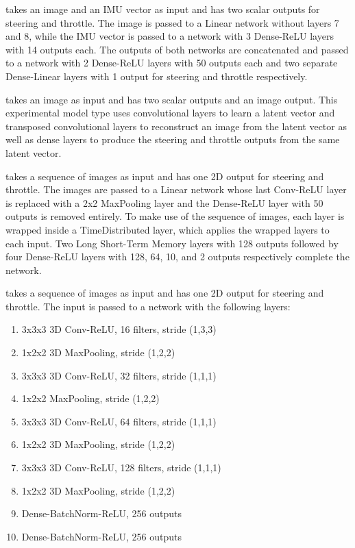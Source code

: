 \documentclass[conference]{IEEEtran}
\begin{document}
\begin{description}
\item[IMU] takes an image and an IMU vector as input and has two scalar outputs for steering and throttle. The image is passed to a Linear network without layers 7 and 8, while the IMU vector is passed to a network with 3 Dense-ReLU layers with 14 outputs each. The outputs of both networks are concatenated and passed to a network with 2 Dense-ReLU layers with 50 outputs each and two separate Dense-Linear layers with 1 output for steering and throttle respectively.
\item[Latent] takes an image as input and has two scalar outputs and an image output. This experimental model type uses convolutional layers to learn a latent vector and transposed convolutional layers to reconstruct an image from the latent vector as well as dense layers to produce the steering and throttle outputs from the same latent vector.
\item[RNN] takes a sequence of images as input and has one 2D output for steering and throttle. The images are passed to a Linear network whose last Conv-ReLU layer is replaced with a 2x2 MaxPooling layer and the Dense-ReLU layer with 50 outputs is removed entirely. To make use of the sequence of images, each layer is wrapped inside a TimeDistributed layer, which applies the wrapped layers to each input. Two Long Short-Term Memory layers with 128 outputs followed by four Dense-ReLU layers with 128, 64, 10, and 2 outputs respectively complete the network.
\item[3D] takes a sequence of images as input and has one 2D output for steering and throttle. The input is passed to a network with the following layers:
\begin{enumerate}
\item
3x3x3 3D Conv-ReLU, 16 filters, stride (1,3,3)
\item
1x2x2 3D MaxPooling, stride (1,2,2)
\item
3x3x3 3D Conv-ReLU, 32 filters, stride (1,1,1)
\item
1x2x2 MaxPooling, stride (1,2,2)
\item
3x3x3 3D Conv-ReLU, 64 filters, stride (1,1,1)
\item
1x2x2 3D MaxPooling, stride (1,2,2)
\item
3x3x3 3D Conv-ReLU, 128 filters, stride (1,1,1)
\item
1x2x2 3D MaxPooling, stride (1,2,2)
\item
Dense-BatchNorm-ReLU, 256 outputs
\item
Dense-BatchNorm-ReLU, 256 outputs

\end{enumerate}
\end{description}
\end{document}
